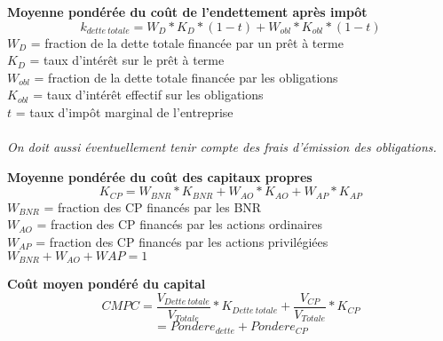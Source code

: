 \newpage
\vspace*{5.75cm}

\begin{RoundBox}
\textbf{Moyenne pondérée du coût de l'endettement après impôt}
$$k_{dette\ totale}=W_D * K_D * (1 - t) + W_{obl}* K_{obl} * (1 - t)$$
{\scriptsize
    $W_D$ = fraction de la dette totale financée par un prêt à terme\\
    $K_D$ = taux d'intérêt sur le prêt à terme\\
    $W_{obl}$ = fraction de la dette totale financée par les obligations\\
    $K_{obl}$ = taux d'intérêt effectif sur les obligations\\
    $t$ = taux d'impôt marginal de l'entreprise
    \\\\
\textit{On doit aussi éventuellement tenir compte des frais d'émission des obligations.}
}
\end{RoundBox}


\begin{RoundBox}
\textbf{Moyenne pondérée du coût des capitaux propres}\\
$$K_{CP}=W_{BNR}*K_{BNR}+W_{AO}*K_{AO}+W_{AP}*K_{AP}$$
{\scriptsize
    $W_{BNR}$ = fraction des CP financés par les BNR \\
    $W_{AO}$ = fraction des CP financés par les actions ordinaires \\
    $W_{AP}$ = fraction des CP financés par les actions privilégiées \\
    $W_{BNR}+W_{AO}+W{AP}=1$
}
\end{RoundBox}


\begin{RoundBox}
\textbf{Coût moyen pondéré du capital}\\
$$CMPC=\frac{V_{Dette\ totale}}{V_{Totale}}*K_{Dette\ totale} + \frac{V_{CP}}{V_{Totale}}*K_{CP}$$
$$=Pondere_{dette} + Pondere_{CP}$$
\end{RoundBox}
